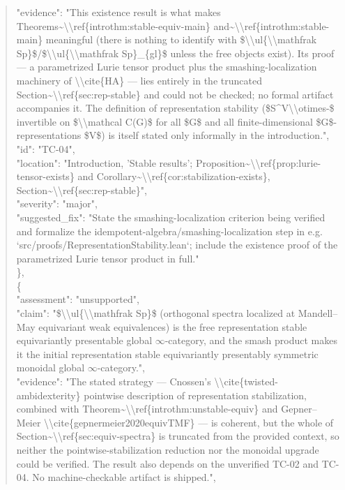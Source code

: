 \documentclass[11pt]{article}
\begin{document}
\begin{quote}
      "evidence": "This existence result is what makes Theorems\~{}\textbackslash{}\textbackslash{}ref\{introthm:stable-equiv-main\} and\~{}\textbackslash{}\textbackslash{}ref\{introthm:stable-main\} meaningful (there is nothing to identify with \$\textbackslash{}\textbackslash{}ul\{\textbackslash{}\textbackslash{}mathfrak Sp\}\$/\$\textbackslash{}\textbackslash{}ul\{\textbackslash{}\textbackslash{}mathfrak Sp\}\_\{gl\}\$ unless the free objects exist). Its proof --- a parametrized Lurie tensor product plus the smashing-localization machinery of \textbackslash{}\textbackslash{}cite\{HA\} --- lies entirely in the truncated Section\~{}\textbackslash{}\textbackslash{}ref\{sec:rep-stable\} and could not be checked; no formal artifact accompanies it. The definition of representation stability (\$S\^{}V\textbackslash{}\textbackslash{}otimes-\$ invertible on \$\textbackslash{}\textbackslash{}mathcal C(G)\$ for all \$G\$ and all finite-dimensional \$G\$-representations \$V\$) is itself stated only informally in the introduction.",\\
      "id": "TC-04",\\
      "location": "Introduction, 'Stable results'; Proposition\~{}\textbackslash{}\textbackslash{}ref\{prop:lurie-tensor-exists\} and Corollary\~{}\textbackslash{}\textbackslash{}ref\{cor:stabilization-exists\}, Section\~{}\textbackslash{}\textbackslash{}ref\{sec:rep-stable\}",\\
      "severity": "major",\\
      "suggested\_fix": "State the smashing-localization criterion being verified and formalize the idempotent-algebra/smashing-localization step in e.g. `src/proofs/RepresentationStability.lean`; include the existence proof of the parametrized Lurie tensor product in full."\\
    \},\\
    \{\\
      "assessment": "unsupported",\\
      "claim": "\$\textbackslash{}\textbackslash{}ul\{\textbackslash{}\textbackslash{}mathfrak Sp\}\$ (orthogonal spectra localized at Mandell--May equivariant weak equivalences) is the free representation stable equivariantly presentable global \ensuremath{\infty}-category, and the smash product makes it the initial representation stable equivariantly presentably symmetric monoidal global \ensuremath{\infty}-category.",\\
      "evidence": "The stated strategy --- Cnossen's \textbackslash{}\textbackslash{}cite\{twisted-ambidexterity\} pointwise description of representation stabilization, combined with Theorem\~{}\textbackslash{}\textbackslash{}ref\{introthm:unstable-equiv\} and Gepner--Meier \textbackslash{}\textbackslash{}cite\{gepnermeier2020equivTMF\} --- is coherent, but the whole of Section\~{}\textbackslash{}\textbackslash{}ref\{sec:equiv-spectra\} is truncated from the provided context, so neither the pointwise-stabilization reduction nor the monoidal upgrade could be verified. The result also depends on the unverified TC-02 and TC-04. No machine-checkable artifact is shipped.",\\

\end{quote}
\end{document}

